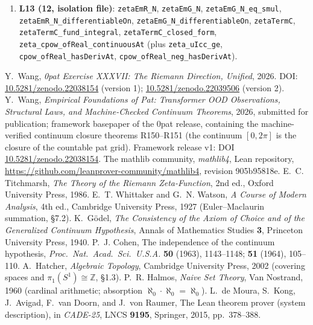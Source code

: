 \documentclass{article}
\begin{document}
{\begin{sloppypar}
\begin{enumerate}
\texttt{net\_flip\_from\_chi\_lift}, \texttt{flip\_count\_from\_theta\_lifts},
\texttt{completedZeta}\(_0\)\_log\_reflection,
\texttt{zeta\_zero\_iff\_completedZeta}\(_0\)\_one\_over\_sum,
\texttt{zeta\_line\_two\_bounded}, \texttt{Gamma\_one\_add\_it\_norm\_le\_one},
\texttt{zeta\_ne\_zero\_on\_bottom\_edge}, \texttt{zeta\_im\_zero\_on\_real},
\texttt{zeta\_neg\_one\_re\_neg}, \texttt{bottom\_edge\_arg\_jump},
\texttt{zeta\_partial\_sum\_lt\_integral\_bound}.
\item \textbf{L13 (12, isolation file)}: \texttt{zetaEmR\_N},
\texttt{zetaEmG\_N}, \texttt{zetaEmG\_N\_eq\_smul},
\texttt{zetaEmR\_N\_differentiableOn}, \texttt{zetaEmG\_N\_differentiableOn},
\texttt{zetaTermC}, \texttt{zetaTermC\_fund\_integral},
\texttt{zetaTermC\_closed\_form}, \texttt{zeta\_cpow\_ofReal\_continuousAt}
(plus \texttt{zeta\_uIcc\_ge}, \texttt{cpow\_ofReal\_hasDerivAt},
\texttt{cpow\_ofReal\_neg\_hasDerivAt}).
\end{enumerate}
\end{sloppypar}}

\begin{thebibliography}{9}
Y.~Wang, \emph{0pat Exercise XXXVII: The Riemann Direction, Unified},
2026. DOI:
\href{https://doi.org/10.5281/zenodo.22038154}{10.5281/zenodo.22038154}
(version 1); \href{https://doi.org/10.5281/zenodo.22039506}{10.5281/zenodo.22039506} (version 2).
Y.~Wang, \emph{Empirical Foundations of Pat: Transformer OOD Observations,
Structural Laws, and Machine-Checked Continuum Theorems}, 2026, submitted
for publication; framework basepaper of the 0pat release, containing the
machine-verified continuum closure theorems R150--R151 (the continuum
$[0,2\pi]$ is the closure of the countable pat grid). Framework release
v1: DOI
\href{https://doi.org/10.5281/zenodo.22038154}{10.5281/zenodo.22038154}.
The mathlib community, \emph{mathlib4}, Lean repository,
\url{https://github.com/leanprover-community/mathlib4}, revision 905b95818e.
E.~C. Titchmarsh, \emph{The Theory of the Riemann Zeta-Function}, 2nd ed.,
Oxford University Press, 1986.
E.~T. Whittaker and G.~N. Watson, \emph{A Course of Modern Analysis}, 4th ed.,
Cambridge University Press, 1927 (Euler--Maclaurin summation, \S7.2).
K.~G\"odel, \emph{The Consistency of the Axiom of Choice and of the
Generalized Continuum Hypothesis}, Annals of Mathematics Studies \textbf{3},
Princeton University Press, 1940.
P.~J. Cohen, The independence of the continuum hypothesis,
\emph{Proc.\ Nat.\ Acad.\ Sci.\ U.S.A.} \textbf{50} (1963), 1143--1148;
\textbf{51} (1964), 105--110.
A.~Hatcher, \emph{Algebraic Topology}, Cambridge University Press, 2002
(covering spaces and $\pi_1(S^1)\cong\mathbb Z$, \S1.3).
P.~R. Halmos, \emph{Naive Set Theory}, Van Nostrand, 1960
(cardinal arithmetic; absorption $\aleph_0\cdot\aleph_0=\aleph_0$).
L.~de Moura, S.~Kong, J.~Avigad, F.~van Doorn, and J.~von Raumer,
The Lean theorem prover (system description), in \emph{CADE-25},
LNCS \textbf{9195}, Springer, 2015, pp.~378--388.
\end{thebibliography}
\end{document}
